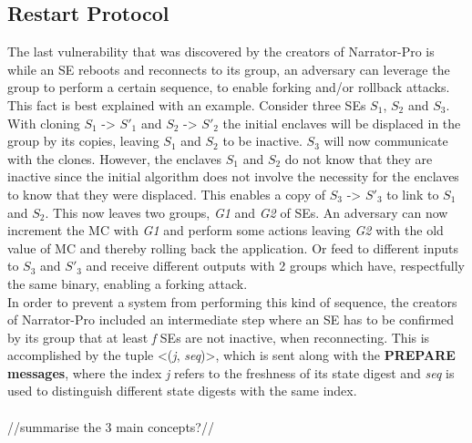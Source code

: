 \subsection{Restart Protocol}
The last vulnerability that was discovered by the creators of Narrator-Pro is while an SE reboots and reconnects to its group, an adversary can leverage the group to perform a certain sequence, to enable forking and/or rollback attacks. This fact is best explained with an example. Consider three SEs \(S_{1}\), \(S_{2}\) and \(S_{3}\). With cloning \(S_{1}\) -> \(S'_{1}\) and \(S_{2}\) -> \(S'_{2}\) the initial enclaves will be displaced in the group by its copies, leaving \(S_{1}\) and \(S_{2}\) to be inactive. \(S_{3}\) will now communicate with the clones. However, the enclaves \(S_{1}\) and \(S_{2}\) do not know that they are inactive since the initial algorithm does not involve the necessity for the enclaves to know that they were displaced. This enables a copy of \(S_{3}\) -> \(S'_{3}\) to link to \(S_{1}\) and \(S_{2}\). This now leaves two groups, \textit{G1} and \textit{G2} of SEs. An adversary can now increment the MC with \textit{G1} and perform some actions leaving \textit{G2} with the old value of MC and thereby rolling back the application. Or feed to different inputs to \(S_{3}\) and \(S'_{3}\) and receive different outputs with 2 groups which have, respectfully the same binary, enabling a forking attack.\\
In order to prevent a system from performing this kind of sequence, the creators of Narrator-Pro included an intermediate step where an SE has to be confirmed by its group that at least \textit{f} SEs are not inactive, when reconnecting. This is accomplished by the tuple <(\textit{j}, \textit{seq})>, which is sent along with the \textbf{PREPARE messages}, where the index \textit{j} refers to the freshness of its state digest and \textit{seq} is used to distinguish different state digests with the same index.\\
\\ 

//summarise the 3 main concepts?//